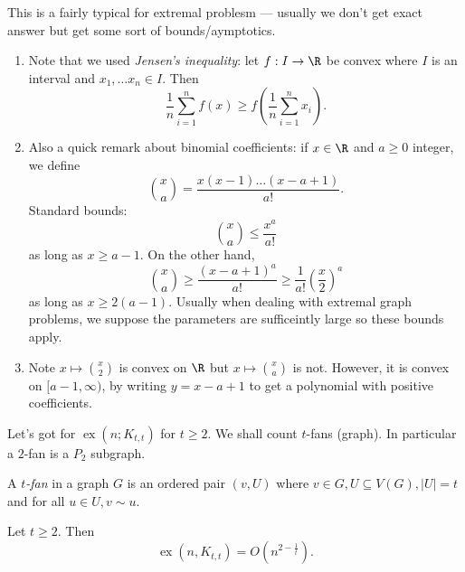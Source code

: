 \documentclass[a4paper]{article}
\DeclareMathOperator{\exx}{ex} %
\begin{document}
This is a fairly typical for extremal problesm --- usually we don't get exact answer but get some sort of bounds/aymptotics.

\begin{remark}\leavevmode
  \begin{enumerate}
  \item Note that we used \emph{Jensen's inequality}: let \(f: I \to \R\) be convex where \(I\) is an interval and \(x_1, \dots x_n \in I\). Then
    \[
      \frac{1}{n} \sum_{i = 1}^n f(x) \geq f(\frac{1}{n} \sum_{i = 1}^n x_i).
    \]
  \item Also a quick remark about binomial coefficients: if \(x \in \R\) and \(a \geq 0\) integer, we define
    \[
      \binom{x}{a} = \frac{x (x - 1) \dots (x - a + 1)}{a!}.
    \]
    Standard bounds:
    \[
      \binom{x}{a} \leq \frac{x^a}{a!}
    \]
    as long as \(x \geq a - 1\). On the other hand,
    \[
      \binom{x}{a} \geq \frac{(x - a + 1)^a}{a!} \geq \frac{1}{a!} \left(\frac{x}{2} \right)^a
    \]
    as long as \(x \geq 2 (a - 1)\). Usually when dealing with extremal graph problems, we suppose the parameters are sufficeintly large so these bounds apply.
  \item Note \(x \mapsto \binom{x}{2}\) is convex on \(\R\) but \(x \mapsto \binom{x}{a}\) is not. However, it is convex on \([a - 1, \infty)\), by writing \(y = x - a + 1\) to get a polynomial with positive coefficients.
  \end{enumerate}
\end{remark}

Let's got for \(\exx(n; K_{t, t})\) for \(t \geq 2\). We shall count \(t\)-fans (graph). In particular a \(2\)-fan is a \(P_2\) subgraph.

\begin{definition}[fan]
  A \emph{\(t\)-fan} in a graph \(G\) is an ordered pair \((v, U)\) where \(v \in G, U \subseteq V(G), |U| = t\) and for all \(u \in U, v \sim u\).
\end{definition}

\begin{theorem}
  Let \(t \geq 2\). Then
  \[
    \exx(n, K_{t, t}) = O(n^{2 - \frac{1}{t}}).
  \]
\end{theorem}
\end{document}
